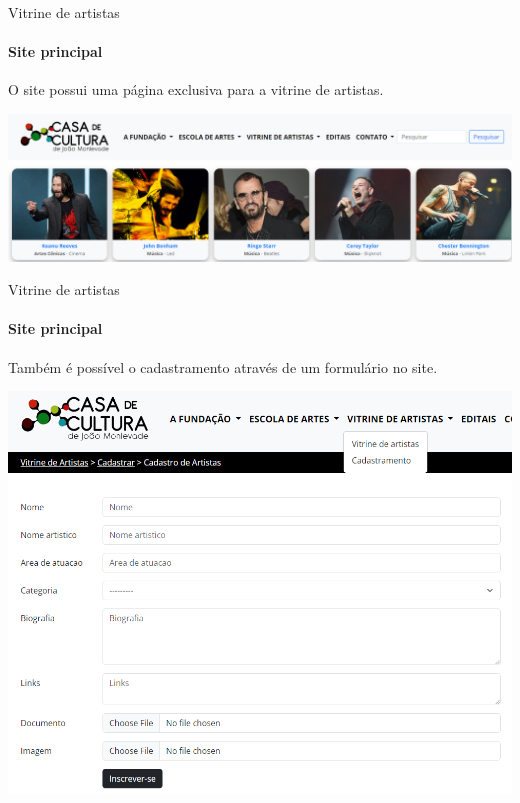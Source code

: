 \begin{frame}{Vitrine de artistas}
\framesubtitle{Site principal}
    O site possui uma página exclusiva para a vitrine de artistas.
    
    \vspace{\baselineskip}
    
        \begin{center}
            \includegraphics[width=\textwidth]{beamerthemesrc/assets/vitrine_de_artistas.png}
        \end{center}
\end{frame}
    
\begin{frame}{Vitrine de artistas}
\framesubtitle{Site principal}
    Também é possível o cadastramento através de um formulário no site.
    
    \vspace{\baselineskip}
    
        \begin{center}
            \includegraphics[scale=0.25]{beamerthemesrc/assets/form_artista.png}
        \end{center}
\end{frame}

